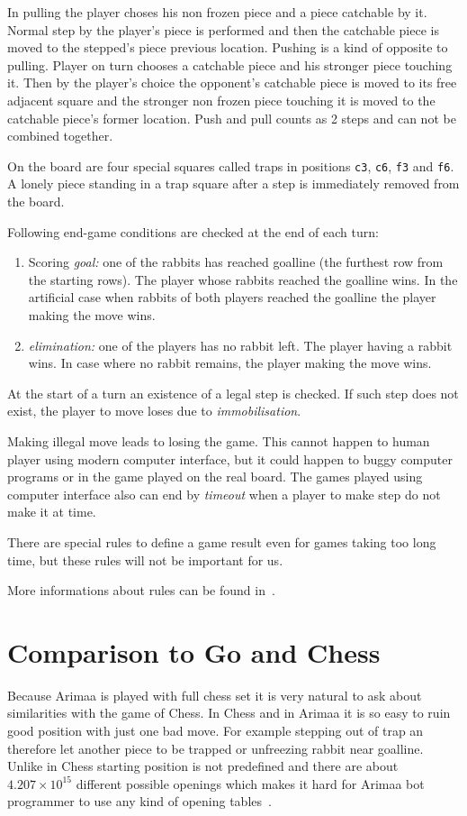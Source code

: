 In pulling the player choses his non frozen piece and a piece catchable by it.
Normal step by the player's piece is performed and then the catchable piece is
moved to the stepped's piece previous location. Pushing is a kind of opposite
to pulling. Player on turn chooses a catchable piece and his stronger piece
touching it. Then by the player's choice the opponent's catchable piece is
moved to its free adjacent square and the stronger non frozen piece touching it
is moved to the catchable piece's former location. Push and pull counts as 2
steps and can not be combined together.

On the board are four special squares called traps in positions \texttt{c3},
\texttt{c6}, \texttt{f3} and \texttt{f6}. A lonely piece standing in a trap
square after a step is immediately removed from the board.

Following end-game conditions are checked at the end of each turn:
\begin{enumerate}
\item Scoring \emph{goal:} one of the rabbits has reached goalline (the
furthest row from the starting rows). The player whose rabbits reached the
goalline wins. In the artificial case when rabbits of both players reached the
goalline the player making the move wins.
\item \emph{elimination:} one of the players has no rabbit left. The player
having a rabbit wins. In case where no rabbit remains, the player making the
move wins.
\end{enumerate}

At the start of a turn an existence of a legal step is checked. If such step
does not exist, the player to move loses due to \emph{immobilisation}.

Making illegal move leads to losing the game. This cannot happen to human
player using modern computer interface, but it could happen to buggy computer
programs or in the game played on the real board. The games played using
computer interface also can end by \emph{timeout} when a player to make step do
not make it at time.

There are special rules to define a game result even for games taking too long
time, but these rules will not be important for us.


More informations about rules can be found in~\cite{arimaa.com}.

\section{Comparison to Go and Chess}
Because Arimaa is played with full chess set it is very natural to ask about
similarities with the game of Chess. In Chess and in Arimaa it is so easy to
ruin good position with just one bad move. For example stepping out of trap an
therefore let another piece to be trapped or unfreezing rabbit near goalline.
Unlike in Chess starting position is not predefined and there are about
$4.207\times10^{15}$ different possible openings which makes it hard for Arimaa
bot programmer to use any kind of opening tables~\cite{COX}.

